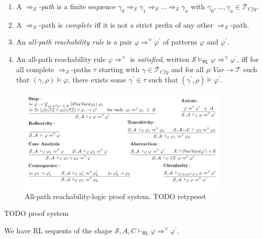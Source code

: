 \documentclass{article}
\newcommand{\RL}{\mathsf{RL}}
\newcommand{\Var}{\mathit{Var}}
\newcommand{\Tcfg}{\mathcal{T}_{\mathit{Cfg}}}
\begin{document}
\begin{definition}
\begin{enumerate}
    \item A \emph{$\Rightarrow_{\mathcal{S}}$-path} is a finite
          sequence $\gamma_0 \Rightarrow_{\mathcal{S}} \gamma_1 \Rightarrow_{\mathcal{S}} \ldots \Rightarrow_{\mathcal{S}} \gamma_n$
          with $\gamma_0,\ldots,\gamma_n \in \Tcfg$.
          
    \item A $\Rightarrow_{\mathcal{S}}$-path is \emph{complete}
          iff it is not a strict prefix of any
          other $\Rightarrow_{\mathcal{S}}$-path.

    \item An \emph{all-path reachability rule}
          is a pair $\varphi \Rightarrow^\forall \varphi^\prime$ of patterns $\varphi$ and $\varphi^\prime$.
    
    \item An all-path reachability rule $\varphi \Rightarrow^\forall$ is \emph{satisfied},
          written $\mathcal{S} \vDash_\RL \varphi \Rightarrow^\forall \varphi^\prime$,
          iff for all complete $\Rightarrow_{\mathcal{S}}$-paths $\tau$
          starting with $\gamma \in \Tcfg$ and for all $\rho : \Var \to \mathcal{T}$
          such that $(\gamma, \rho) \vDash \varphi$,
          there exists some $\gamma^\prime \in \tau$
          such that $(\gamma^\prime, \rho) \vDash \varphi^\prime$.
\end{enumerate}

\begin{figure}
    \centering
    \includegraphics[width=0.9\textwidth]{img/rl-proofsystem.png}
    \caption{All-path reachability-logic proof system. TODO retypeset}
    \label{fig:RLproofsystem}
\end{figure}

TODO proof system

We have RL sequents of the shape $\mathcal{S}, A, C \vdash_\RL \varphi \Rightarrow^\forall \varphi^\prime$.

\end{definition}
\end{document}
